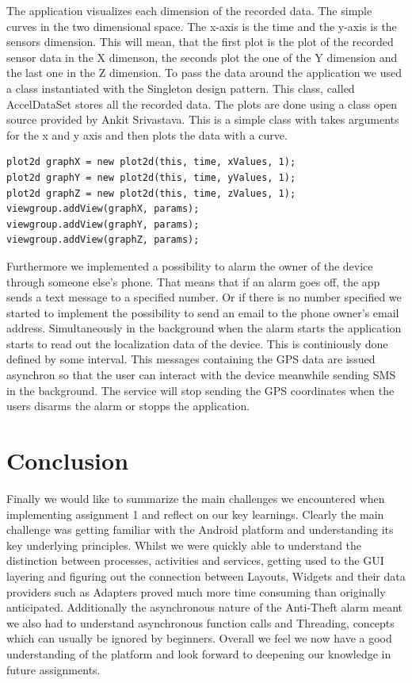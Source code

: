 \documentclass{report}
\begin{document}
The application visualizes each dimension of the recorded data. The simple curves in the two dimensional space. The x-axis is the time and the y-axis is the sensors dimension. This will mean, that the first plot is the plot of the recorded sensor data in the X dimenson, the seconds plot the one of the Y dimension and the last one in the Z dimension. To pass the data around the application we used a class instantiated with the Singleton design pattern. This class, called AccelDataSet stores all the recorded data. The plots are done using a class open source provided by Ankit Srivastava\cite{androidplot}. This is a simple class with takes arguments for the x and y axis and then plots the data with a curve.

\begin{lstlisting}
plot2d graphX = new plot2d(this, time, xValues, 1);
plot2d graphY = new plot2d(this, time, yValues, 1);
plot2d graphZ = new plot2d(this, time, zValues, 1);
viewgroup.addView(graphX, params);
viewgroup.addView(graphY, params);
viewgroup.addView(graphZ, params);
\end{lstlisting}

Furthermore we implemented a possibility to alarm the owner of the device through someone else's phone. That means that if an alarm goes off, the app sends a text message to a specified number. Or if there is no number specified we started to implement the possibility to send an email to the phone owner's email address. 
Simultaneously in the background when the alarm starts the application starts to read out the localization data of the device. This is continiously done defined by some interval. This messages containing the GPS data are issued asynchron so that the user can interact with the device meanwhile sending SMS in the background. The service will stop sending the GPS coordinates when the users disarms the alarm or stopps the application.

\section{Conclusion}

Finally we would like to summarize the main challenges we encountered when implementing assignment 1 and reflect on our key learnings. Clearly the main challenge was getting familiar with the Android platform and understanding its key underlying principles. Whilst we were quickly able to understand the distinction between processes, activities and services, getting used to the GUI layering and figuring out the connection between Layouts, Widgets and their data providers such as Adapters proved much more time consuming than originally anticipated. Additionally the asynchronous nature of the Anti-Theft alarm meant we also had to understand asynchronous function calls and Threading, concepts which can usually be ignored by beginners. Overall we feel we now have a good understanding of the platform and look forward to deepening our knowledge in future assignments.
\end{document}
